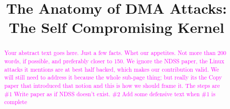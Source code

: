\usepackage{filecontents}

\providecommand{\data}{\textit{data }}
\providecommand{\shinfo}{\texttt{skb\_shared\_info }}
\providecommand{\skb}{\texttt{sk\_buff }}
\providecommand{\page}{\texttt{struct page }}
\providecommand{\uarg}{\texttt{ubuf\_info }}
\providecommand{\kva}{KVA }
\providecommand{\iova}{IOVA }
\providecommand{\mabaf}{malicious buffer }
\providecommand{\spb}{SPB\-2 }
\providecommand{\oportunity}{\textit{Opportunity} }
\providecommand{\means}{\textit{Means} }
\providecommand{\motivation}{\textit{Motivation} }

\newcommand{\SV}[1]{{\textcolor{red}{[Shay:#1}]}} 



\date{}

\title{\Large \bf The Anatomy of DMA Attacks: The Self Compromising Kernel}

\begin{comment}
\author{
{\rm Markuze Alex}\\
Technion, VMware Research
\and
{\rm Gil Kupfer}\\
Technion
\and
{\rm Nadav Amit}\\
VMware Research
\and{\rm Dan Tsafrir}\\
Technion, VMware Research
} %
\end{comment}

\maketitle

\begin{abstract}
\textcolor{magenta}{Your abstract text goes here. Just a few facts. Whet our appetites.
Not more than 200 words, if possible, and preferably closer to 150.\newline
We ignore the NDSS paper, the Linux attacks it mentions are at best half backed, which makes our contribution valid. We will still need to address it because the whole sub-page thing; but really its the Copy paper that introduced that notion and this is how we should frame it. The steps are \#1 Write paper as if NDSS doesn't exist. \#2 Add some defensive text when \#1 is complete}
\end{abstract}


